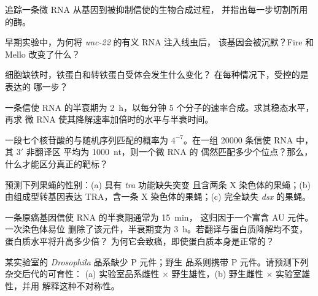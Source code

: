 \begin{exercise}[$\star$]\label{exo:b3:rna-regulation:2}
追踪一条微 RNA 从基因到被抑制信使的生物合成过程，
并指出每一步切割所用的酶。
\end{exercise}

\begin{exercise}[$\star$]\label{exo:b3:rna-regulation:3}
早期实验中，为何将 \emph{unc-22} 的有义 RNA 注入线虫后，
该基因会被沉默？Fire 和 Mello 改变了什么？
\end{exercise}

\begin{exercise}[$\star$]\label{exo:b3:rna-regulation:4}
细胞缺铁时，铁蛋白和转铁蛋白受体会发生什么变化？
在每种情况下，受控的是表达的
哪一步？
\end{exercise}

\begin{exercise}[$\star\star$]\label{exo:b3:rna-regulation:5}
一条信使 RNA 的半衰期为 \qty{2}{h}，以每分钟 $5$
个分子的速率合成。求其稳态水平，再求
微 RNA 使其降解速率加倍时的水平与半衰时间。
\end{exercise}

\begin{exercise}[$\star\star$]\label{exo:b3:rna-regulation:6}
一段七个核苷酸的与随机序列匹配的概率为
$4^{-7}$。在一组 \num{20000} 条信使 RNA 中，其 3$'$ 非翻译区
平均为 \qty{1000}{nt}，则一个微 RNA 的
偶然匹配多少个位点？那么，什么才能区分真正的靶标？
\end{exercise}

\begin{exercise}[$\star\star$]\label{exo:b3:rna-regulation:7}
预测下列果蝇的性别：(a) 具有 \emph{tra} 功能缺失突变
且含两条 X 染色体的果蝇；(b) 由组成型转基因表达
TRA，含一条 X 染色体的果蝇；(c) 完全缺失 \emph{dsx} 的果蝇。
\end{exercise}

\begin{exercise}[$\star\star$]\label{exo:b3:rna-regulation:8}
一条原癌基因信使 RNA 的半衰期通常为 \qty{15}{min}，
这归因于一个富含 AU 元件。一次染色体易位
删除了该元件，半衰期变为 \qty{3}{h}。若翻译与蛋白质降解均不变，
蛋白质水平将升高多少倍？
为何它会致癌，即使蛋白质本身是正常的？
\end{exercise}

\begin{exercise}[$\star\star$]\label{exo:b3:rna-regulation:9}
某实验室的 \emph{Drosophila} 品系缺少 P 元件；野生
品系则携带 P 元件。请预测下列杂交后代的可育性：
(a) 实验室品系雌性 $\times$ 野生雄性，(b) 野生雌性 $\times$
实验室雄性，并用  解释这种不对称性。
\end{exercise}

